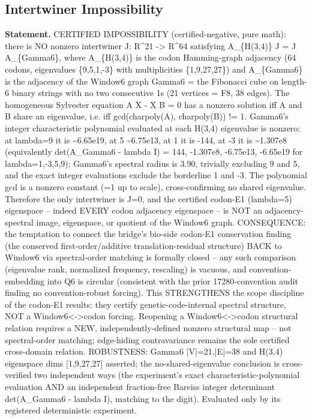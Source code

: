 \subsection{Intertwiner Impossibility}\label{sec:bridge-intertwiner-impossibility}
\textbf{Statement.} CERTIFIED IMPOSSIBILITY (certified-negative, pure math): there is NO nonzero intertwiner J:
R\textasciicircum{}21 -> R\textasciicircum{}64 satisfying A\_\{H(3,4)\} J = J A\_\{Gamma6\}, where
A\_\{H(3,4)\} is the codon Hamming-graph adjacency (64 codons, eigenvalues \{9,5,1,-3\} with
multiplicities \{1,9,27,27\}) and A\_\{Gamma6\} is the adjacency of the Window6 graph Gamma6 = the
Fibonacci cube on length-6 binary strings with no two consecutive 1s (21 vertices = F8, 38 edges).
The homogeneous Sylvester equation A X - X B = 0 has a nonzero solution iff A and B share an
eigenvalue, i.e. iff gcd(charpoly(A), charpoly(B)) != 1. Gamma6's integer characteristic polynomial
evaluated at each H(3,4) eigenvalue is nonzero: at lambda=9 it is \textasciitilde{}6.65e19, at 5
\textasciitilde{}6.75e13, at 1 it is -144, at -3 it is \textasciitilde{}1.307e8 (equivalently
det(A\_Gamma6 - lambda I) = 144, -1.307e8, -6.75e13, -6.65e19 for lambda=1,-3,5,9); Gamma6's
spectral radius is 3.90, trivially excluding 9 and 5, and the exact integer evaluations exclude the
borderline 1 and -3. The polynomial gcd is a nonzero constant (=1 up to scale), cross-confirming no
shared eigenvalue. Therefore the only intertwiner is J=0, and the certified codon-E1 (lambda=5)
eigenspace -- indeed EVERY codon adjacency eigenspace -- is NOT an adjacency-spectral image,
eigenspace, or quotient of the Window6 graph. CONSEQUENCE: the temptation to connect the bridge's
bio-side codon-E1 conservation finding (the conserved first-order/additive translation-residual
structure) BACK to Window6 via spectral-order matching is formally closed -- any such comparison
(eigenvalue rank, normalized frequency, rescaling) is vacuous, and convention-embedding into Q6 is
circular (consistent with the prior 17280-convention audit finding no convention-robust forcing).
This STRENGTHENS the scope discipline of the codon-E1 results: they certify genetic-code-internal
spectral structure, NOT a Window6<->codon forcing. Reopening a Window6<->codon structural relation
requires a NEW, independently-defined nonzero structural map -- not spectral-order matching;
edge-hiding contravariance remains the sole certified cross-domain relation. ROBUSTNESS: Gamma6
|V|=21,|E|=38 and H(3,4) eigenspace dims [1,9,27,27] asserted; the no-shared-eigenvalue conclusion
is cross-verified two independent ways (the experiment's exact characteristic-polynomial evaluation
AND an independent fraction-free Bareiss integer determinant det(A\_Gamma6 - lambda I), matching to
the digit). Evaluated only by its registered deterministic experiment.

